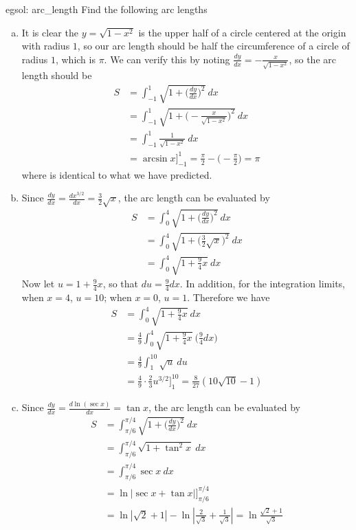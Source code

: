 \begin{egsol}[]{egsol: arc_length}
    Find the following arc lengths
    \begin{enumerate}[a)]
        \item It is clear the $y = \sqrt{1-x^2}$ is the upper half of a circle centered at the origin with radius $1$, so our arc length should be half the circumference of a circle of radius $1$, which is $\pi$.  We can verify this by noting $\frac{dy}{dx} = -\frac{x}{\sqrt{1-x^2}}$, so the arc length should be
        \begin{align*}
            S &= \int_{-1}^1 \sqrt{1+\Big(\frac{dy}{dx}\Big)^2}~dx\\
            &= \int_{-1}^1 \sqrt{1+\Big(-\frac{x}{\sqrt{1-x^2}}\Big)^2}~dx\\
            &= \int_{-1}^1 \frac{1}{\sqrt{1-x^2}}~dx\\
            &= \arcsin x\Big]_{-1}^1 = \frac{\pi}{2} - \Big(-\frac{\pi}{2}\Big) = \pi
        \end{align*}
        where is identical to what we have predicted.
        \item Since $\frac{dy}{dx} = \frac{d x^{3/2}}{dx} = \frac{3}{2} \sqrt{x}$, the arc length can be evaluated by
        \begin{align*}
            S &= \int_0^4\sqrt{1+\Big(\frac{dy}{dx}\Big)^2}~dx\\
            &= \int_0^4\sqrt{1+\big(\frac{3}{2}\sqrt{x}\big)^2}~dx\\
            &= \int_0^4\sqrt{1+\frac{9}{4}x}~dx
        \end{align*}
        Now let $u = 1+\frac{9}{4}x$, so that $du = \frac{9}{4}dx$.  In addition, for the integration limits, when $x = 4$, $u = 10$; when $x = 0$, $u = 1$.  Therefore we have
        \begin{align*}
            S &= \int_0^4\sqrt{1+\frac{9}{4}x}~dx\\
            &=\frac{4}{9} \int_0^4\sqrt{1+\frac{9}{4}x}~\Big(\frac{9}{4}dx\Big)\\
            &=\frac{4}{9}  \int_1^10\sqrt{u}~du\\
            &= \frac{4}{9}\cdot \frac{2}{3}u^{3/2}\Big]_1^10 = \frac{8}{27}(10\sqrt{10}-1)
        \end{align*}
        \item Since $\frac{dy}{dx} = \frac{d \ln(\sec x)}{dx} = \tan x$, the arc length can be evaluated by
        \begin{align*}
            S &= \int_{\pi/6}^{\pi/4}\sqrt{1+\Big(\frac{dy}{dx}\Big)^2}~dx\\
            &= \int_{\pi/6}^{\pi/4}\sqrt{1+\tan^2 x}~dx\\
            &= \int_{\pi/6}^{\pi/4} \sec x~dx\\
            &= \ln|\sec x + \tan x|\big]_{\pi/6}^{\pi/4}\\
            &= \ln|\sqrt{2} + 1| - \ln|\frac{2}{\sqrt{3}}+\frac{1}{\sqrt{3}}| = \ln \frac{\sqrt{2}+1}{\sqrt{3}}
        \end{align*}
    \end{enumerate}
\end{egsol}

